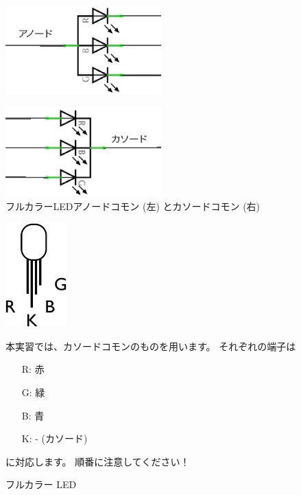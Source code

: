 \documentclass[11pt,a4paper]{jarticle}
\begin{document}

\begin{figure}[h!]
 \begin{minipage}{0.5\columnwidth}
  \centering
  \includegraphics[width=60mm]{img/fullColorLEDCommonAnode.eps}
  \label{circuit}
 \end{minipage}
 \begin{minipage}{0.5\columnwidth}
  \centering
  \includegraphics[width=60mm]{img/fullColorLEDCommonCathode.eps}
 \end{minipage}
 \caption{フルカラーLEDアノードコモン (左) とカソードコモン (右) }
  \label{fullColorLEDCommonAnode&Cathode}
\end{figure}

\begin{figure}[h!]
 \begin{minipage}{0.35\columnwidth}
  \centering
  \includegraphics[height=40mm]{img/full_color_led_detail.eps}
  \caption{フルカラー LED}
 \end{minipage}
 \begin{minipage}{0.65\columnwidth}
  本実習では、カソードコモンのものを用います。%
  それぞれの端子は
  \begin{itemize}
   \item[R:] 赤
   \item[G:] 緑
   \item[B:] 青
   \item[K:] - (カソード)
  \end{itemize}
  に対応します。
  順番に注意してください！
 \end{minipage}
\end{figure}
\end{document}
